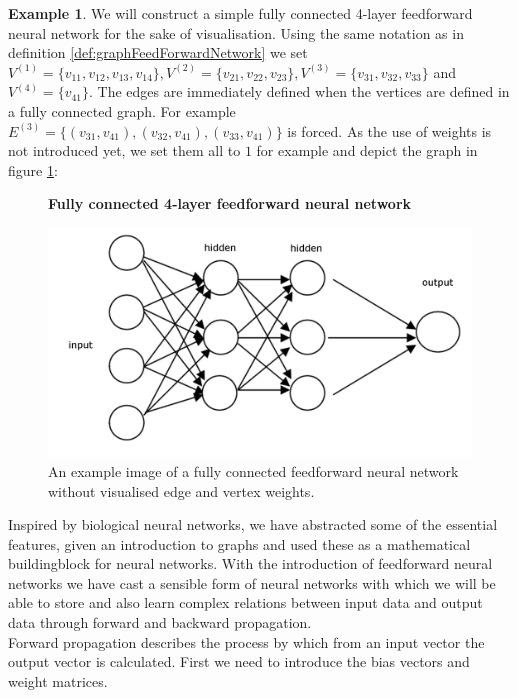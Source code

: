 \documentclass{article}
\theoremstyle{definition}
\newtheorem{example}[theorem]{Example}
\newcommand*{\figuretitle}[1]{%
    {\centering%
    \textbf{#1}%
    \par\medskip}%
}
\begin{document}
\begin{example}
We will construct a simple fully connected 4-layer feedforward neural network for the sake of visualisation. Using the same notation as in definition \ref{def:graphFeedForwardNetwork} we set $V^{(1)}=\{v_{11}, v_{12}, v_{13}, v_{14}\}, V^{(2)}=\{v_{21}, v_{22}, v_{23}\}, V^{(3)}=\{v_{31}, v_{32}, v_{33}\}$ and $V^{(4)}=\{v_{41}\}$. The edges are immediately defined when the vertices are defined in a fully connected graph. For example $E^{(3)}=\{(v_{31}, v_{41}), (v_{32}, v_{41}), (v_{33}, v_{41})\}$ is forced. As the use of weights is not introduced yet, we set them all to $1$ for example and depict the graph in figure \ref{fig:4LayerNetwork}: 
\begin{figure}[H]
\centering
\figuretitle{Fully connected 4-layer feedforward neural network}
\includegraphics[scale=0.85]{graphics/MultiLayerNeuralNetwork.png}
\caption{An example image of a fully connected feedforward neural network without visualised edge and vertex weights\cite{neuralNetwork2020}.} 
\label{fig:4LayerNetwork}
\end{figure}

\end{example}

Inspired by biological neural networks, we have abstracted some of the essential features, given an introduction to graphs and used these as a mathematical buildingblock for neural networks.
With the introduction of feedforward neural networks we have cast a sensible form of neural networks with which we will be able to store and also learn complex relations between input data and output data through forward and backward propagation.\\
Forward propagation describes the process by which from an input vector the output vector is calculated. First we need to introduce the bias vectors and weight matrices.
\end{document}
